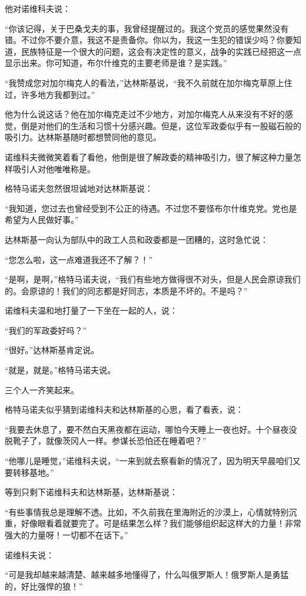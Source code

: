 他对诺维科夫说：

“你该记得，关于巴桑戈夫的事，我曾经提醒过的。我这个党员的感觉果然没有错。不过你不要介意，我这不是责备你。你以为，我这一生犯的错误少吗？你要知道，民族特征是一个很大的问题，这会有决定性的意义，战争的实践已经把这一点显示出来。你可知道，布尔什维克的主要老师是谁？是实践。”

“我赞成您对加尔梅克人的看法，”达林斯基说，“我不久前就在加尔梅克草原上住过，许多地方我都到过。”

他为什么说这话？他在加尔梅克走过不少地方，对加尔梅克人从来没有不好的感觉，倒是对他们的生活和习惯十分感兴趣。但是，这位军政委似乎有一股磁石般的吸引力。达林斯基随时都想赞同他的意见。

诺维科夫微微笑着看了看他，他倒是很了解政委的精神吸引力，很了解这种力量怎样吸引人对他唯唯称是。

格特马诺夫忽然很坦诚地对达林斯基说：

“我知道，您过去也曾经受到不公正的待遇。不过您不要怪布尔什维克党。党也是希望为人民做好事。”

达林斯基一向认为部队中的政工人员和政委都是一团糟的，这时急忙说：

“您怎么啦，这一点难道我还不了解？！”

“是啊，是啊，”格特马诺夫说，“我们有些地方做得很不对头，但是人民会原谅我们的。会原谅的！我们的同志都是好同志，本质是不坏的。不是吗？”

诺维科夫温和地打量了一下坐在一起的人，说：

“我们的军政委好吗？”

“很好。”达林斯基肯定说。

“就是，就是。”格特马诺夫说。

三个人一齐笑起来。

格特马诺夫似乎猜到诺维科夫和达林斯基的心思，看了看表，说：

“我要去休息了，要不然白天黑夜都在运动，哪怕今天睡上一夜也好。十个昼夜没脱靴子了，就像茨冈人一样。参谋长恐怕还在睡着吧？”

“他哪儿是睡觉，”诺维科夫说，“一来到就去察看新的情况了，因为明天早晨咱们又要转移基地。”

等到只剩下诺维科夫和达林斯基，达林斯基说：

“有些事情我总是理解不透。比如，不久前我在里海附近的沙漠上，心情就特别沉重，好像眼看着就要完了。可是结果怎么样？我们能够组织起这样大的力量！非常强大的力量呀！一切都不在话下。”

诺维科夫说：

“可是我却越来越清楚、越来越多地懂得了，什么叫俄罗斯人！俄罗斯人是勇猛的，好比强悍的狼！”

